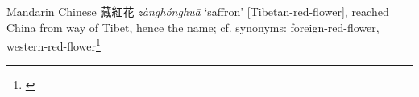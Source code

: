 \begin{etymology}\label{ety:zanghonghua}
Mandarin Chinese {藏紅花} \textit{zànghónghuā} `saffron' [Tibetan-red-flower], reached China from way of Tibet, hence the name; cf. synonyms: foreign-red-flower, western-red-flower\footnote{\textcite{kleeman_oxford_2010}}
\end{etymology}